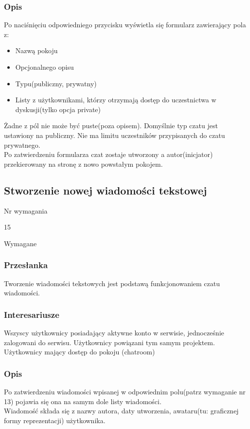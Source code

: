 \documentclass[eng,printmode]{mgr}
\begin{document}
\subsubsection{Opis}
Po naciśnięciu odpowiedniego przycisku wyświetla się formularz zawierający pola z:
\begin{itemize}
  \item Nazwą pokoju
  \item Opcjonalnego opisu
  \item Typu(publiczny, prywatny)
  \item Listy z użytkownikami, którzy otrzymają dostęp do uczestnictwa w dyskusji(tylko opcja private)
\end{itemize}
Żadne z pól nie może być puste(poza opisem). Domyślnie typ czatu jest ustawiony na publiczny. Nie ma limitu uczestników przypisanych do czatu prywatnego.
\\
Po zatwierdzeniu formularza czat zostaje utworzony a autor(inicjator) przekierowany na stronę z nowo powstałym pokojem.

\subsection{Stworzenie nowej wiadomości tekstowej}
\begin{labeling}{Nr wymagania}
\item [Nr wymagania:] 15
\item [Priorytet:] Wymagane
\end{labeling}

\subsubsection{Przesłanka}
Tworzenie wiadomości tekstowych jest podstawą funkcjonowaniem czatu wiadomości.

\subsubsection{Interesariusze}
Wszyscy użytkownicy posiadający aktywne konto w serwisie, jednocześnie zalogowani do serwisu. Użytkownicy powiązani tym samym projektem. Użytkownicy mający dostęp do pokoju (chatroom)

\subsubsection{Opis}
Po zatwierdzeniu wiadomości wpisanej w odpowiednim polu(patrz wymaganie nr 13) pojawia się ona na samym dole listy wiadomości.
\\
Wiadomość składa się z nazwy autora, daty utworzenia, awataru(tu: graficznej formy reprezentacji) użytkownika.
\end{document}

